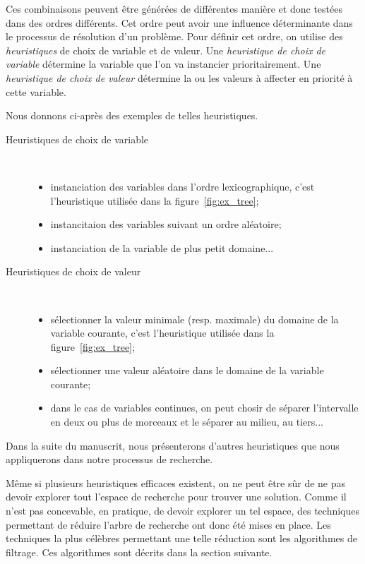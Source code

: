 Ces combinaisons peuvent être générées de différentes manière et donc
testées dans des ordres différents. Cet ordre peut avoir une influence
déterminante dans le processus de résolution d'un problème. Pour
définir cet ordre, on utilise des {\it heuristiques} de choix de
variable et de valeur. Une {\it heuristique de choix de
  variable} détermine la variable que l'on va instancier
prioritairement. Une {\it heuristique de choix de
  valeur} détermine la ou les valeurs à affecter en priorité à
cette variable. 

Nous donnons ci-après des exemples de telles heuristiques. 
\begin{description}
\item[Heuristiques de choix de variable]~

  \begin{itemize}
  \item instanciation des variables dans l'ordre lexicographique,
    c'est l'heuristique utilisée dans la figure~\ref{fig:ex_tree};
  \item instancitaion des variables suivant un ordre aléatoire;
  \item instanciation de la variable de plus petit domaine...
  \end{itemize}
\item[Heuristiques de choix de valeur] ~

  \begin{itemize}
  \item sélectionner la valeur minimale (resp. maximale) du domaine de
    la variable courante, c'est l'heuristique utilisée dans la
    figure~\ref{fig:ex_tree}; 
  \item sélectionner une valeur aléatoire dans le domaine de la
    variable courante;
  \item dans le cas de variables continues, on peut chosir de séparer
    l'intervalle en deux ou plus de morceaux et le séparer au milieu,
    au tiers...
  \end{itemize}
\end{description}
Dans la suite du manuscrit, nous présenterons d'autres heuristiques
que nous appliquerons dans notre processus de recherche. 

Même si plusieurs heuristiques efficaces existent, on ne peut être sûr
de ne pas devoir explorer tout l'espace de recherche pour trouver une
solution. Comme il n'est pas concevable, en pratique, de devoir
explorer un tel espace, des techniques permettant de réduire l'arbre
de recherche ont donc été mises en place. Les techniques la plus
célèbres permettant une telle réduction sont les algorithmes de
filtrage. Ces algorithmes sont décrits dans la section suivante.

